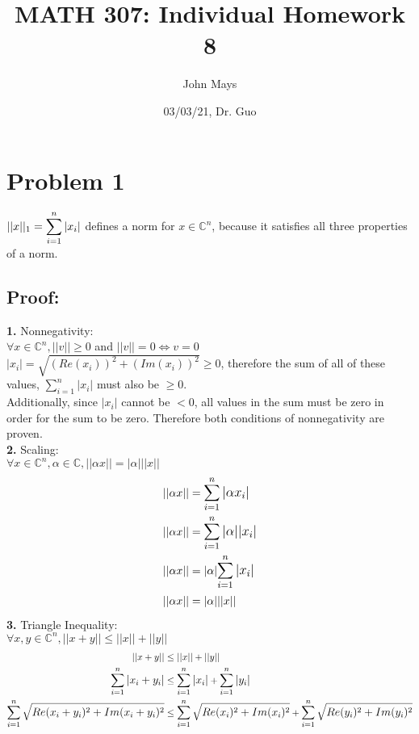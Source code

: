 \documentclass{article}
\title{\textbf{MATH 307: Individual Homework 8}}
\author{John Mays}
\date{03/03/21, Dr. Guo}
\begin{document}
\maketitle

\section*{Problem 1}

$||x||_1=\mathlarger{\sum_{i=1}^n|x_i|}$ defines a norm for $x\in\mathbb{C}^ n$, because it satisfies all three properties of a norm.
\subsection*{Proof:}
\textbf{1. }Nonnegativity:\\

$\forall x\in\mathbb{C}^n, ||v||\geq 0$ and $||v||=0 \iff v= 0$\\

$|x_i|=\sqrt{(Re(x_i))^2+(Im(x_i))^2} \geq 0$, therefore the sum of all of these values, $\sum_{i=1}^n|x_i|$ must also be $\geq 0$.\\ 

Additionally, since $|x_i|$ cannot be $< 0$, all values in the sum must be zero in order for the sum to be zero.  Therefore both conditions of nonnegativity are proven.\\

\textbf{2. }Scaling:\\

$\forall x \in \mathbb{C}^n, \alpha\in\mathbb{C}, ||\alpha x||=|\alpha|||x||$
\begin{equation*}
    \begin{split}
        ||\alpha x|| &= \mathlarger{\sum_{i=1}^n|\alpha x_i|}\\
        ||\alpha x|| &= \mathlarger{\sum_{i=1}^n|\alpha||x_i|}\\
        ||\alpha x|| &= |\alpha|\mathlarger{\sum_{i=1}^n|x_i|}\\
        ||\alpha x|| &=|\alpha|||x||
    \end{split}
\end{equation*}
\textbf{3. }Triangle Inequality:\\

$\forall x, y \in \mathbb{C}^n, ||x+y||\leq||x||+||y||$
\begin{equation*}
    \begin{split}
        ||x+y||&\leq||x||+||y||\\
        \mathlarger{\sum_{i=1}^n|x_i+y_i|}&\leq \mathlarger{\sum_{i=1}^n|x_i|} + \mathlarger{\sum_{i=1}^n|y_i|}\\
        \mathlarger{\sum_{i=1}^n\sqrt{Re(x_i+y_i)^2+Im(x_i+y_i)^2}}&\leq \mathlarger{\sum_{i=1}^n\sqrt{Re(x_i)^2+Im(x_i)^2}} + \mathlarger{\sum_{i=1}^n \sqrt{Re(y_i)^2+Im(y_i)^2}}
    \end{split}
\end{equation*}
\end{document}
